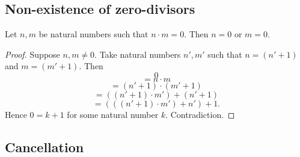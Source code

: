 \documentclass[../arithmetic.tex]{subfiles}
\begin{document}
  \subsection*{Non-existence of zero-divisors}

  \begin{forthel}
    \begin{proposition}
      Let $n, m$ be natural numbers such that $n \cdot m = 0$.
      Then $n = 0$ or $m = 0$.
    \end{proposition}
    \begin{proof}
      Suppose $n, m \neq 0$.
      Take natural numbers $n', m'$ such that $n = (n' \plus 1)$ and $m = (m' \plus 1)$.
      Then
      \[  0                                     \]
      \[    = n \cdot m                         \]
      \[    = (n' \plus 1) \cdot (m' \plus 1)           \]
      \[    = ((n' \plus 1) \cdot m') \plus (n' \plus 1)    \]
      \[    = (((n' \plus 1) \cdot m') \plus n') \plus 1.   \]
      Hence $0 = k \plus 1$ for some natural number $k$.
      Contradiction.
    \end{proof}
  \end{forthel}


  \subsection*{Cancellation}
\end{document}
